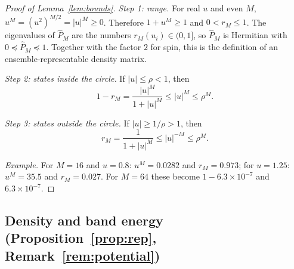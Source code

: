 \documentclass[aps,prb,twocolumn,superscriptaddress,floatfix,longbibliography]{revtex4-2}
\theoremstyle{remark}
\begin{document}
\begin{proof}[Proof of Lemma~\ref{lem:bounds}]
\emph{Step 1: range.} For real $u$ and even $M$, $u^M=(u^2)^{M/2}=|u|^M\ge0$. Therefore $1+u^M\ge1$ and $0<r_M\le1$.
The eigenvalues of $\hat P_M$ are the numbers $r_M(u_i)\in(0,1]$, so $\hat P_M$ is Hermitian with $0\preceq\hat P_M\preceq1$.
Together with the factor $2$ for spin, this is the definition of an ensemble-representable density matrix.

\emph{Step 2: states inside the circle.} If $|u|\le\rho<1$, then
\begin{equation}
1-r_M=\frac{|u|^M}{1+|u|^M}\le|u|^M\le\rho^M .
\end{equation}

\emph{Step 3: states outside the circle.} If $|u|\ge1/\rho>1$, then
\begin{equation}
r_M=\frac{1}{1+|u|^M}\le|u|^{-M}\le\rho^M .
\end{equation}

\emph{Example.} For $M=16$ and $u=0.8$: $u^M=0.0282$ and $r_M=0.973$; for $u=1.25$: $u^M=35.5$ and $r_M=0.027$.
For $M=64$ these become $1-6.3\times10^{-7}$ and $6.3\times10^{-7}$.
\end{proof}

\subsection{Density and band energy (Proposition~\ref{prop:rep}, Remark~\ref{rem:potential})}
\end{document}
